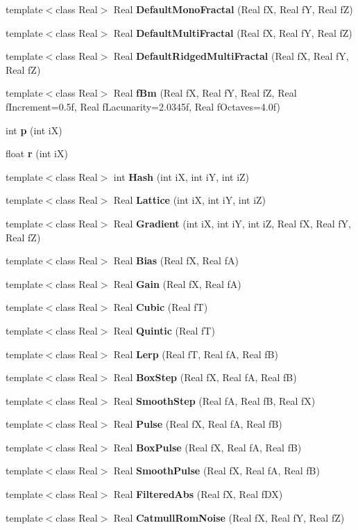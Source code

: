 \begin{CompactItemize}
template$<$class Real$>$ Real {\bf Default\-Mono\-Fractal} (Real f\-X, Real f\-Y, Real f\-Z)
\item 
template$<$class Real$>$ Real {\bf Default\-Multi\-Fractal} (Real f\-X, Real f\-Y, Real f\-Z)
\item 
template$<$class Real$>$ Real {\bf Default\-Ridged\-Multi\-Fractal} (Real f\-X, Real f\-Y, Real f\-Z)
\item 
template$<$class Real$>$ Real {\bf f\-Bm} (Real f\-X, Real f\-Y, Real f\-Z, Real f\-Increment=0.5f, Real f\-Lacunarity=2.0345f, Real f\-Octaves=4.0f)
\item 
int {\bf p} (int i\-X)
\item 
float {\bf r} (int i\-X)
\item 
template$<$class Real$>$ int {\bf Hash} (int i\-X, int i\-Y, int i\-Z)
\item 
template$<$class Real$>$ Real {\bf Lattice} (int i\-X, int i\-Y, int i\-Z)
\item 
template$<$class Real$>$ Real {\bf Gradient} (int i\-X, int i\-Y, int i\-Z, Real f\-X, Real f\-Y, Real f\-Z)
\item 
template$<$class Real$>$ Real {\bf Bias} (Real f\-X, Real f\-A)
\item 
template$<$class Real$>$ Real {\bf Gain} (Real f\-X, Real f\-A)
\item 
template$<$class Real$>$ Real {\bf Cubic} (Real f\-T)
\item 
template$<$class Real$>$ Real {\bf Quintic} (Real f\-T)
\item 
template$<$class Real$>$ Real {\bf Lerp} (Real f\-T, Real f\-A, Real f\-B)
\item 
template$<$class Real$>$ Real {\bf Box\-Step} (Real f\-X, Real f\-A, Real f\-B)
\item 
template$<$class Real$>$ Real {\bf Smooth\-Step} (Real f\-A, Real f\-B, Real f\-X)
\item 
template$<$class Real$>$ Real {\bf Pulse} (Real f\-X, Real f\-A, Real f\-B)
\item 
template$<$class Real$>$ Real {\bf Box\-Pulse} (Real f\-X, Real f\-A, Real f\-B)
\item 
template$<$class Real$>$ Real {\bf Smooth\-Pulse} (Real f\-X, Real f\-A, Real f\-B)
\item 
template$<$class Real$>$ Real {\bf Filtered\-Abs} (Real f\-X, Real f\-DX)
\item 
template$<$class Real$>$ Real {\bf Catmull\-Rom\-Noise} (Real f\-X, Real f\-Y, Real f\-Z)
\item 

\end{CompactItemize}
